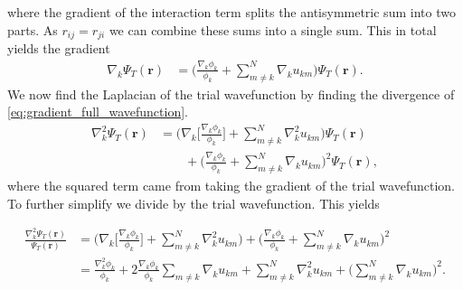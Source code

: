 \documentclass[
    a4paper, aps, twocolumn, floatfix, superscriptaddress, nofootinbib]{revtex4-1}
\newcommand{\vf}{\mathbf}
\newcommand{\1}{\mathds{1}}
\begin{document}
            where the gradient of the interaction term splits the antisymmetric
            sum into two parts. As $r_{ij} = r_{ji}$ we can combine these sums
            into a single sum. This in total yields the gradient
            \begin{align}
                \nabla_k\Psi_T(\vf{r})
                &=
                \Biggl(
                    \frac{\nabla_k\phi_k}{\phi_k}
                    + \sum_{m \neq k}^N
                    \nabla_k u_{km}
                \Biggr)
                \Psi_T(\vf{r}).
                \label{eq:gradient_full_wavefunction}
            \end{align}
            We now find the Laplacian of the trial wavefunction by finding the
            divergence of \autoref{eq:gradient_full_wavefunction}.
            \begin{align}
                \nabla_k^2\Psi_T(\vf{r})
                &=
                \Biggl(
                    \nabla_k\Biggl[
                        \frac{\nabla_k\phi_k}{\phi_k}
                    \Biggr]
                    +
                    \sum_{m \neq k}^N \nabla_k^2 u_{km}
                \Biggr)\Psi_T(\vf{r})
                \\
                &\qquad
                +
                \Biggl(
                    \frac{\nabla_k\phi_k}{\phi_k}
                    + \sum_{m \neq k}^N
                    \nabla_k u_{km}
                \Biggr)^2
                \Psi_T(\vf{r}),
            \end{align}
            where the squared term came from taking the gradient of the trial
            wavefunction.  To further simplify we divide by the trial
            wavefunction. This yields
            \begin{widetext}
                \begin{align}
                    \frac{\nabla_k^2\Psi_T(\vf{r})}{\Psi_T(\vf{r})}
                    &=
                    \Biggl(
                        \nabla_k\Biggl[
                            \frac{\nabla_k\phi_k}{\phi_k}
                        \Biggr]
                        +
                        \sum_{m \neq k}^N \nabla_k^2 u_{km}
                    \Biggr)
                    +
                    \Biggl(
                        \frac{\nabla_k\phi_k}{\phi_k}
                        + \sum_{m \neq k}^N
                        \nabla_k u_{km}
                    \Biggr)^2 \\
                    &=
                    \frac{\nabla_k^2\phi_k}{\phi_k}
                    + 2\frac{\nabla_k\phi_k}{\phi_k}
                    \sum_{m \neq k}\nabla_k u_{km}
                    + \sum_{m\neq k}^N\nabla_k^2 u_{km}
                    + \Biggl(
                        \sum_{m \neq k}^N\nabla_k u_{km}
                    \Biggr)^2.
                \end{align}
            \end{widetext}
\end{document}
